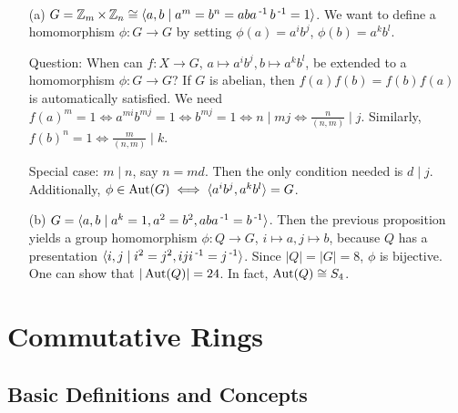 \documentclass[11pt]{book}
\theoremstyle{definition}   \newtheorem{defn}[counter]{Definition} %
\newcommand{\gen}[1]{\langle #1 \rangle}   \newcommand{\stab}[2]{\tn{Stab}_{#1}(#2)}   \newcommand{\fix}[2]{\tn{Fix}_{#1}(#2)}
\DeclareMathOperator{\ra}{\rightarrow}   \DeclareMathOperator{\Poly}{\mathbf{P}}   \DeclareMathOperator{\spn}{\textnormal{span}}   \DeclareMathOperator{\aut}{\textnormal{Aut}}
\numberwithin{counter}{chapter}
\begin{document}
\begin{example}
\
\begin{enumerate}
\item[(a)] $G = \z_m \times \z_n \cong \gen{a,b \mid a^m = b^n = aba\inv b\inv = 1}$. We want to define a homomorphism $\phi : G \ra G$ by setting $\phi(a) = a^i b^j$, $\phi(b) = a^k b^l$.

Question: When can $f : X \ra G$, $a \mapsto a^i b^j, b \mapsto a^k b^l$, be extended to a homomorphism $\phi : G \ra G$? If $G$ is abelian, then $f(a) f(b) = f(b) f(a)$ is automatically satisfied. We need $f(a)^m = 1 \iff a^{mi} b^{mj} = 1 \iff b^{mj} = 1 \iff n \mid mj \iff \frac{n}{(n,m)} \mid j$. Similarly, $f(b)^n = 1 \iff \frac{m}{(n,m)} \mid k$.

Special case: $m \mid n$, say $n = md$. Then the only condition needed is $d \mid j$. Additionally, $\phi \in \aut(G) \iff \gen{a^ib^j, a^kb^l} = G$.

\item[(b)] $G = \gen{a,b \mid a^k = 1, a^2 = b^2, aba\inv = b\inv}$. Then the previous proposition yields a group homomorphism $\phi : Q \ra G$, $i \mapsto a, j \mapsto b$, because $Q$ has a presentation $\gen{i,j \mid i^2 = j^2, iji\inv = j\inv}$. Since $|Q| = |G| = 8$, $\phi$ is bijective. One can show that $|\aut(Q)| = 24$. In fact, $\aut(Q) \cong S_4$.
\end{enumerate}
\end{example}



\part{Commutative Rings}

\chapter{ \null Basic Definitions and Concepts}
\end{document}

